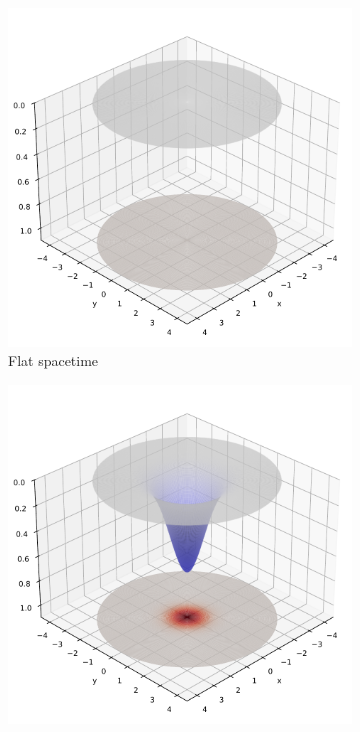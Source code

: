 \documentclass[12pt]{article}
\begin{document}
\begin{figure}[H]
  \centering
  \begin{subfigure}[b]{0.3\textwidth}
    \includegraphics[width=\textwidth]{frame_001_flat_spacetime.pdf}
    \caption{Flat spacetime}
  \end{subfigure}
  \hfill
  \begin{subfigure}[b]{0.3\textwidth}
    \includegraphics[width=\textwidth]{frame_060_subcritical.pdf}

\end{subfigure}
\end{figure}
\end{document}
